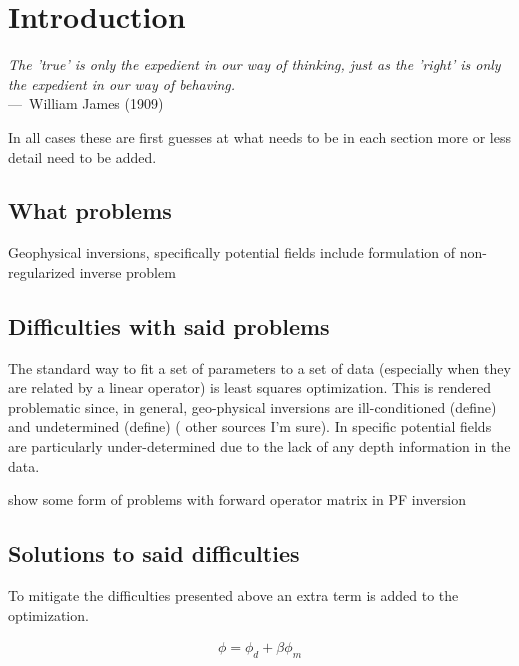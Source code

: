 
\chapter{Introduction}
\label{ch:Introduction}

\begin{epigraph}
\emph{The 'true' is only the expedient in our way of thinking, just as the 'right' is only the expedient in our way of behaving.}\\
---~William James (1909)
\end{epigraph}


In all cases these are first guesses at what needs to be in each section more or less detail need to be added.

\section{What problems}
\label{sec:What problems}

Geophysical inversions, specifically potential fields 
include formulation of non-regularized inverse problem

\section{Difficulties with said problems }
\label{sec:Difficulties with said problems }

The standard way to fit a set of parameters to a set of data (especially when they are related by a linear operator) is least squares optimization. This is rendered problematic since, in general, geo-physical inversions are ill-conditioned (define) and undetermined (define) (\cite{oldenburg2005inversion} other sources I'm sure). In specific potential fields are particularly under-determined due to the lack of any depth information in the data.

show some form of problems with forward operator matrix in PF inversion

\section{Solutions to said difficulties}
\label{sec:Solutions to said difficulties}

To mitigate the difficulties presented above an extra term is added to the optimization. 

\begin{align}
\phi = \phi_d + \beta\phi_m
\end{align}
\label{eq:objective function}

